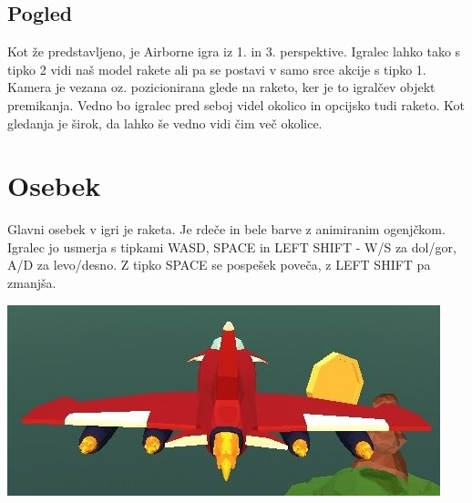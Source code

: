 \documentclass[a4paper]{article}
\begin{document}
\subsection{Pogled}
Kot že predstavljeno, je Airborne igra iz 1. in 3. perspektive. Igralec lahko tako s tipko 2 vidi naš model rakete ali pa se postavi v samo srce akcije s tipko 1. Kamera je vezana oz. pozicionirana glede na raketo, ker je to igralčev objekt premikanja. Vedno bo igralec pred seboj videl okolico in opcijsko tudi raketo. Kot gledanja je širok, da lahko še vedno vidi čim več okolice.

\section{Osebek}
Glavni osebek v igri je raketa. Je rdeče in bele barve z animiranim ogenjčkom. Igralec jo usmerja s tipkami WASD, SPACE in LEFT SHIFT - W/S za dol/gor, A/D za levo/desno. Z tipko SPACE se pospešek poveča, z LEFT SHIFT pa zmanjša. 

\begin{center}
     \includegraphics[width=\columnwidth]{raketa.jpg}
\end{center}
\end{document}

